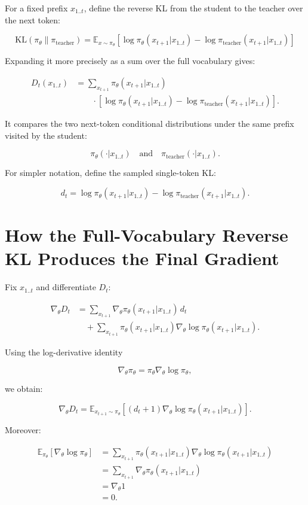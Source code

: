 \documentclass[11pt,a4paper]{article}
\begin{document}
For a fixed prefix $x_{1..t}$, define the reverse KL from the student to the teacher over the next token:

\[
\boxed{
\mathrm{KL}\left(\pi_\theta\|\pi_{\text{teacher}}\right)
=
\mathbb E_{x\sim\pi_\theta}
\left[
\log \pi_\theta(x_{t+1}|x_{1..t})
-
\log \pi_{\text{teacher}}(x_{t+1}|x_{1..t})
\right]
}
\]

Expanding it more precisely as a sum over the full vocabulary gives:

\[
\begin{aligned}
D_t(x_{1..t})
&=
\sum_{x_{t+1}}
\pi_\theta(x_{t+1}|x_{1..t})\\
&\qquad\cdot
\left[
\log\pi_\theta(x_{t+1}|x_{1..t})
-
\log\pi_{\text{teacher}}(x_{t+1}|x_{1..t})
\right].
\end{aligned}
\]

It compares the two next-token conditional distributions under the same prefix visited by the student:

\[
\pi_\theta(\cdot|x_{1..t})
\quad\text{and}\quad
\pi_{\text{teacher}}(\cdot|x_{1..t}).
\]

For simpler notation, define the sampled single-token KL:

\[
d_t
=
\log\pi_\theta(x_{t+1}|x_{1..t})
-
\log\pi_{\text{teacher}}(x_{t+1}|x_{1..t}).
\]

\section{How the Full-Vocabulary Reverse KL Produces the Final Gradient}

Fix $x_{1..t}$ and differentiate $D_t$:

\[
\begin{aligned}
\nabla_\theta D_t
&=
\sum_{x_{t+1}}
\nabla_\theta\pi_\theta(x_{t+1}|x_{1..t})\,d_t\\
&\quad+
\sum_{x_{t+1}}
\pi_\theta(x_{t+1}|x_{1..t})
\nabla_\theta\log\pi_\theta(x_{t+1}|x_{1..t}).
\end{aligned}
\]

Using the log-derivative identity

\[
\nabla_\theta\pi_\theta
=
\pi_\theta\nabla_\theta\log\pi_\theta,
\]

we obtain:

\[
\nabla_\theta D_t
=
\mathbb E_{x_{t+1}\sim\pi_\theta}
\left[
(d_t+1)
\nabla_\theta\log\pi_\theta(x_{t+1}|x_{1..t})
\right].
\]

Moreover:

\[
\begin{aligned}
\mathbb E_{\pi_\theta}
\left[\nabla_\theta\log\pi_\theta\right]
&=
\sum_{x_{t+1}}
\pi_\theta(x_{t+1}|x_{1..t})
\nabla_\theta\log\pi_\theta(x_{t+1}|x_{1..t})\\
&=
\sum_{x_{t+1}}
\nabla_\theta\pi_\theta(x_{t+1}|x_{1..t})\\
&=\nabla_\theta 1\\
&=0.
\end{aligned}
\]
\end{document}
